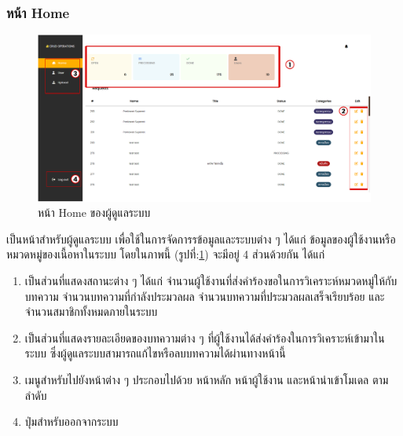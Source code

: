 \documentclass[12pt,oneside,openright,a4paper]{cpe-thai-project}
\begin{document}
\subsubsection{หน้า Home}
\begin{figure}[!ht]\centering
  \includegraphics[width=15cm]{./img/project_ui/admin_home.png} 
  \caption{หน้า Home ของผู้ดูแลระบบ}\label{fig:admin_home} 
\end{figure}
\hspace*{1cm}เป็นหน้าสำหรับผู้ดูแลระบบ เพื่อใช้ในการจัดการรข้อมูลและระบบต่าง ๆ ได้แก่ ข้อมูลของผู้ใช้งานหรือหมวดหมู่ของเนื้อหาในระบบ
โดยในภาพนี้ (รูปที่:\ref{fig:admin_home}) จะมีอยู่ 4 ส่วนด้วยกัน ได้แก่
\begin{enumerate}
  \item เป็นส่วนที่แสดงสถานะต่าง ๆ ได้แก่ จำนวนผู้ใช้งานที่ส่งคำร้องขอในการวิเคราะห์หมวดหมู่ให้กับบทความ จำนวนบทความที่กำลังประมวลผล 
        จำนวนบทความที่ประมวลผลเสร็จเรียบร้อย และจำนวนสมาชิกทั้งหมดภายในระบบ
  \item เป็นส่วนที่แสดงรายละเอียดของบทความต่าง ๆ ที่ผู้ใช้งานได้ส่งคำร้องในการวิเคราะห์เข้ามาในระบบ ซึ่งผู้ดูแลระบบสามารถแก้ไขหรือลบบทความได้ผ่านทางหน้านี้
  \item เมนูสำหรับไปยังหน้าต่าง ๆ ประกอบไปด้วย หน้าหลัก หน้าผู้ใช้งาน และหน้านำเข้าโมเดล ตามลำดับ
  \item ปุ่มสำหรับออกจากระบบ
\end{enumerate}
\end{document}
